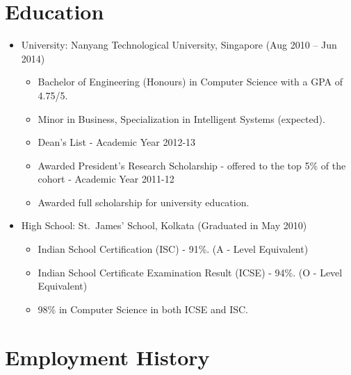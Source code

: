 
\section{Education}\label{education}

\begin{itemize}
\tightlist
\item
  University: Nanyang Technological University, Singapore \hfill (Aug
  2010 -- Jun 2014)

  \begin{itemize}
  \tightlist
  \item
    Bachelor of Engineering (Honours) in Computer Science with a GPA of
    4.75/5.
  \item
    Minor in Business, Specialization in Intelligent Systems (expected).
  \item
    Dean's List - Academic Year 2012-13
  \item
    Awarded President's Research Scholarship - offered to the top 5\% of
    the cohort - Academic Year 2011-12
  \item
    Awarded full scholarship for university education.
  \end{itemize}
\item
  High School: St.~James' School, Kolkata \hfill (Graduated in May 2010)

  \begin{itemize}
  \tightlist
  \item
    Indian School Certification (ISC) - 91\%. (A - Level Equivalent)
  \item
    Indian School Certificate Examination Result (ICSE) - 94\%. (O -
    Level Equivalent)
  \item
    98\% in Computer Science in both ICSE and ISC.
  \end{itemize}
\end{itemize}

\section{Employment History}\label{employment-history}

